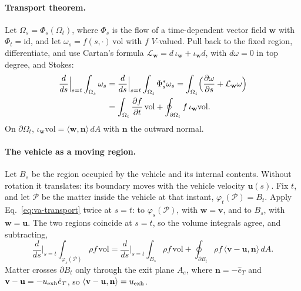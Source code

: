 \paragraph{Transport theorem.} Let $\Omega_s=\Phi_s(\Omega_t)$, where
$\Phi_s$ is the flow of a time-dependent vector field $\mathbf w$ with
$\Phi_t=\mathrm{id}$, and let $\omega_s=f(s,\cdot)\,\mathrm{vol}$ with $f$
$V$-valued. Pull back to the fixed region, differentiate, and use Cartan's
formula $\mathcal L_{\mathbf w}=d\,\iota_{\mathbf w}+\iota_{\mathbf w}d$,
with $d\omega=0$ in top degree, and Stokes:
\begin{equation}\label{eq:va-transport}
\begin{aligned}
 \frac{d}{ds}\Big|_{s=t}\int_{\Omega_s}\omega_s
 &=\frac{d}{ds}\Big|_{s=t}\int_{\Omega_t}\Phi_s^*\omega_s
 =\int_{\Omega_t}\Bigl(\frac{\partial\omega}{\partial s}
   +\mathcal L_{\mathbf w}\omega\Bigr)\\
 &=\int_{\Omega_t}\frac{\partial f}{\partial t}\,\mathrm{vol}
   +\oint_{\partial\Omega_t}f\,\iota_{\mathbf w}\mathrm{vol}.
\end{aligned}
\end{equation}
On $\partial\Omega_t$, $\iota_{\mathbf w}\mathrm{vol}=\langle\mathbf w,
\mathbf n\rangle\,dA$ with $\mathbf n$ the outward normal.

\paragraph{The vehicle as a moving region.} Let $B_s$ be the region occupied
by the vehicle and its internal contents. Without rotation it translates:
its boundary moves with the vehicle velocity $\mathbf u(s)$. Fix $t$, and
let $\mathcal P$ be the matter inside the vehicle at that instant,
$\varphi_t(\mathcal P)=B_t$. Apply Eq.~\ref{eq:va-transport} twice at
$s=t$: to $\varphi_s(\mathcal P)$, with $\mathbf w=\mathbf v$, and to $B_s$,
with $\mathbf w=\mathbf u$. The two regions coincide at $s=t$, so the volume
integrals agree, and subtracting,
\begin{equation}\label{eq:va-material-vs-region}
 \frac{d}{ds}\Big|_{s=t}\int_{\varphi_s(\mathcal P)}\rho f\,\mathrm{vol}
 =\frac{d}{ds}\Big|_{s=t}\int_{B_s}\rho f\,\mathrm{vol}
  +\oint_{\partial B_t}\rho f\,\langle\mathbf v-\mathbf u,\mathbf n\rangle\,dA .
\end{equation}
Matter crosses $\partial B_t$ only through the exit plane $A_e$, where
$\mathbf n=-\hat e_T$ and $\mathbf v-\mathbf u=-u_{\rm exh}\hat e_T$, so
$\langle\mathbf v-\mathbf u,\mathbf n\rangle=u_{\rm exh}$.

